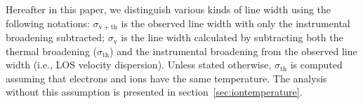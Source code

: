Hereafter in this paper, we distinguish various kinds of line width using the following notations: $\sigma_\mathrm{v+th}$ is the observed line width with only the instrumental broadening subtracted; $\sigma_\mathrm{v}$ is the line width calculated by subtracting both the thermal broadening ($\sigma_\mathrm{th}$) and the instrumental broadening from the observed line width (i.e., LOS velocity dispersion). Unless stated otherwise, $\sigma_\mathrm{th}$ is computed assuming that electrons and ions have the same temperature. The analysis without this assumption is presented in section~\ref{sec:iontemperature}.
